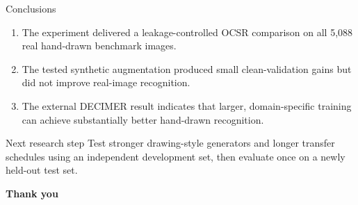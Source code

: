 \documentclass[aspectratio=169,10pt]{beamer}
\begin{document}
\begin{frame}{Conclusions}
  \begin{enumerate}
    \setlength{\itemsep}{0.42cm}
    \item The experiment delivered a leakage-controlled OCSR comparison on all 5,088 real hand-drawn benchmark images.
    \item The tested synthetic augmentation produced small clean-validation gains but did not improve real-image recognition.
    \item The external DECIMER result indicates that larger, domain-specific training can achieve substantially better hand-drawn recognition.
  \end{enumerate}
  \vspace{0.35cm}
  \begin{block}{Next research step}
    Test stronger drawing-style generators and longer transfer schedules using an independent development set, then evaluate once on a newly held-out test set.
  \end{block}
  \vfill
  \begin{center}
    \Large\color{navy}\textbf{Thank you}
  \end{center}
\end{frame}
\end{document}
